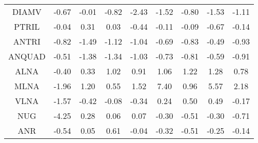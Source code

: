 \begin{longtable}{ | c || c | c | c | c | c | c | c || c |}
DIAMV &  \cellcolor[HTML]{FFEFEF} -0.67 &  \cellcolor[HTML]{FFFFFF} -0.01 &  \cellcolor[HTML]{FFE7E7} -0.82 &  \cellcolor[HTML]{FFBFBF} -2.43 &  \cellcolor[HTML]{FFD7D7} -1.52 &  \cellcolor[HTML]{FFE7E7} -0.80 &  \cellcolor[HTML]{FFD7D7} -1.53 &  \cellcolor[HTML]{FFE7E7} -1.11 \\
PTRIL &  \cellcolor[HTML]{FFFFFF} -0.04 &  \cellcolor[HTML]{F7F7FF} 0.31 &  \cellcolor[HTML]{FFFFFF} 0.03 &  \cellcolor[HTML]{FFF7F7} -0.44 &  \cellcolor[HTML]{FFFFFF} -0.11 &  \cellcolor[HTML]{FFFFFF} -0.09 &  \cellcolor[HTML]{FFEFEF} -0.67 &  \cellcolor[HTML]{FFFFFF} -0.14 \\
ANTRI &  \cellcolor[HTML]{FFE7E7} -0.82 &  \cellcolor[HTML]{FFD7D7} -1.49 &  \cellcolor[HTML]{FFDFDF} -1.12 &  \cellcolor[HTML]{FFE7E7} -1.04 &  \cellcolor[HTML]{FFEFEF} -0.69 &  \cellcolor[HTML]{FFE7E7} -0.83 &  \cellcolor[HTML]{FFEFEF} -0.49 &  \cellcolor[HTML]{FFE7E7} -0.93 \\
ANQUAD &  \cellcolor[HTML]{FFEFEF} -0.51 &  \cellcolor[HTML]{FFDFDF} -1.38 &  \cellcolor[HTML]{FFDFDF} -1.34 &  \cellcolor[HTML]{FFE7E7} -1.03 &  \cellcolor[HTML]{FFEFEF} -0.73 &  \cellcolor[HTML]{FFE7E7} -0.81 &  \cellcolor[HTML]{FFEFEF} -0.59 &  \cellcolor[HTML]{FFE7E7} -0.91 \\
ALNA &  \cellcolor[HTML]{FFF7F7} -0.40 &  \cellcolor[HTML]{F7F7FF} 0.33 &  \cellcolor[HTML]{E7E7FF} 1.02 &  \cellcolor[HTML]{E7E7FF} 0.91 &  \cellcolor[HTML]{E7E7FF} 1.06 &  \cellcolor[HTML]{DFDFFF} 1.22 &  \cellcolor[HTML]{DFDFFF} 1.28 &  \cellcolor[HTML]{EFEFFF} 0.78 \\
MLNA &  \cellcolor[HTML]{FFCFCF} -1.96 &  \cellcolor[HTML]{DFDFFF} 1.20 &  \cellcolor[HTML]{EFEFFF} 0.55 &  \cellcolor[HTML]{D7D7FF} 1.52 &  \cellcolor[HTML]{4848FF} 7.40 &  \cellcolor[HTML]{E7E7FF} 0.96 &  \cellcolor[HTML]{7070FF} 5.57 &  \cellcolor[HTML]{C7C7FF} 2.18 \\
VLNA &  \cellcolor[HTML]{FFD7D7} -1.57 &  \cellcolor[HTML]{FFF7F7} -0.42 &  \cellcolor[HTML]{FFFFFF} -0.08 &  \cellcolor[HTML]{FFF7F7} -0.34 &  \cellcolor[HTML]{F7F7FF} 0.24 &  \cellcolor[HTML]{EFEFFF} 0.50 &  \cellcolor[HTML]{EFEFFF} 0.49 &  \cellcolor[HTML]{FFF7F7} -0.17 \\
NUG &  \cellcolor[HTML]{FF9797} -4.25 &  \cellcolor[HTML]{F7F7FF} 0.28 &  \cellcolor[HTML]{FFFFFF} 0.06 &  \cellcolor[HTML]{FFFFFF} 0.07 &  \cellcolor[HTML]{FFF7F7} -0.30 &  \cellcolor[HTML]{FFEFEF} -0.51 &  \cellcolor[HTML]{FFF7F7} -0.30 &  \cellcolor[HTML]{FFEFEF} -0.71 \\
ANR &  \cellcolor[HTML]{FFEFEF} -0.54 &  \cellcolor[HTML]{FFFFFF} 0.05 &  \cellcolor[HTML]{EFEFFF} 0.61 &  \cellcolor[HTML]{FFFFFF} -0.04 &  \cellcolor[HTML]{FFF7F7} -0.32 &  \cellcolor[HTML]{FFEFEF} -0.51 &  \cellcolor[HTML]{FFF7F7} -0.25 &  \cellcolor[HTML]{FFFFFF} -0.14 \\

\end{longtable}
